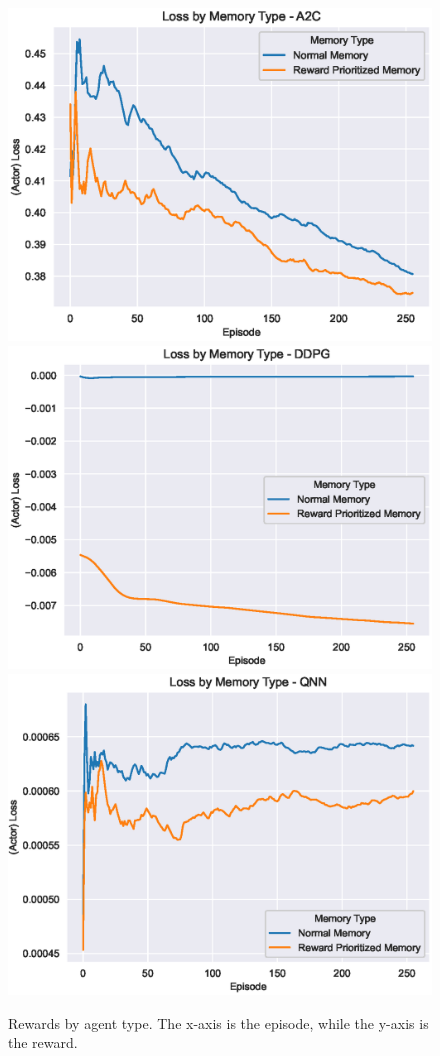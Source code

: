 \begin{figure}[!ht]
    \centering
    \includegraphics[scale=0.5]
    {./figures/memory/loss-by-memory-A2C}
    \includegraphics[scale=0.5]
    {./figures/memory/loss-by-memory-DDPG}
    \includegraphics[scale=0.5]
    {./figures/memory/loss-by-memory-QNN}
    \caption{
        Rewards by agent type.
        The x-axis is the episode, while the y-axis is the reward.
    }
    \label{fig:loss-by-memory}
\end{figure}

